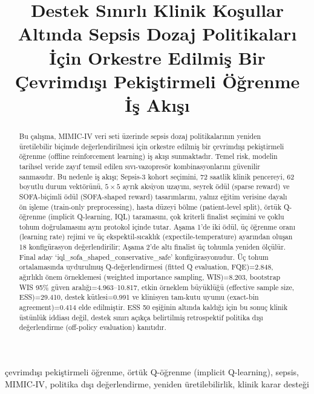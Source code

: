 \documentclass[conference]{IEEEtran}
\begin{document}
\title{Destek Sınırlı Klinik Koşullar Altında Sepsis Dozaj Politikaları İçin Orkestre Edilmiş Bir Çevrimdışı Pekiştirmeli Öğrenme İş Akışı}

\author{
}

\maketitle

\begin{abstract}
Bu çalışma, MIMIC-IV veri seti üzerinde sepsis dozaj politikalarının yeniden üretilebilir biçimde değerlendirilmesi için orkestre edilmiş bir çevrimdışı pekiştirmeli öğrenme (offline reinforcement learning) iş akışı sunmaktadır. Temel risk, modelin tarihsel veride zayıf temsil edilen sıvı-vazopresör kombinasyonlarını güvenilir sanmasıdır. Bu nedenle iş akışı; Sepsis-3 kohort seçimini, 72 saatlik klinik pencereyi, 62 boyutlu durum vektörünü, $5\times5$ ayrık aksiyon uzayını, seyrek ödül (sparse reward) ve SOFA-biçimli ödül (SOFA-shaped reward) tasarımlarını, yalnız eğitim verisine dayalı ön işleme (train-only preprocessing), hasta düzeyi bölme (patient-level split), örtük Q-öğrenme (implicit Q-learning, IQL) taramasını, çok kriterli finalist seçimini ve çoklu tohum doğrulamasını aynı protokol içinde tutar. Aşama 1'de iki ödül, üç öğrenme oranı (learning rate) rejimi ve üç ekspektil-sıcaklık (expectile-temperature) ayarından oluşan 18 konfigürasyon değerlendirilir; Aşama 2'de altı finalist üç tohumla yeniden ölçülür. Final aday `iql\_sofa\_shaped\_conservative\_safe' konfigürasyonudur. Üç tohum ortalamasında uydurulmuş Q-değerlendirmesi (fitted Q evaluation, FQE)=2.848, ağırlıklı önem örneklemesi (weighted importance sampling, WIS)=8.203, bootstrap WIS 95\% güven aralığı=4.963--10.817, etkin örneklem büyüklüğü (effective sample size, ESS)=29.410, destek kütlesi=0.991 ve klinisyen tam-kutu uyumu (exact-bin agreement)=0.414 elde edilmiştir. ESS 50 eşiğinin altında kaldığı için bu sonuç klinik üstünlük iddiası değil, destek sınırı açıkça belirtilmiş retrospektif politika dışı değerlendirme (off-policy evaluation) kanıtıdır.
\end{abstract}

\begin{IEEEkeywords}
çevrimdışı pekiştirmeli öğrenme, örtük Q-öğrenme (implicit Q-learning), sepsis, MIMIC-IV, politika dışı değerlendirme, yeniden üretilebilirlik, klinik karar desteği
\end{IEEEkeywords}
\end{document}
